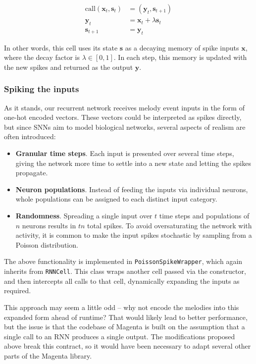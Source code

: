 \documentclass[../../report.tex]{subfiles}
\begin{document}
\begin{align*}
  \mathrm{call}(\bm{x}_t, \bm{s}_t) &= (\bm{y}_t, \bm{s}_{t+1}) \\
  \bm{y}_t &= \bm{x}_t + \lambda\bm{s}_{t} \\
  \bm{s}_{t+1} &= \bm{y}_t
\end{align*}

In other words, this cell uses its state \(\bm{s}\) as a decaying memory of
spike inputs \(\bm{x}\), where the decay factor is \(\lambda \in [0, 1]\). In
each step, this memory is updated with the new spikes and returned as the output
\(\bm{y}\).

\subsubsection{Spiking the inputs}
As it stands, our recurrent network receives melody event inputs in the form of
one-hot encoded vectors. These vectors could be interpreted as spikes directly,
but since SNNs aim to model biological networks, several aspects of realism are
often introduced:

\begin{itemize}
  \item \textbf{Granular time steps}. Each input is presented over several time
  steps, giving the network more time to settle into a new state and letting the
  spikes propagate.

  \item \textbf{Neuron populations}. Instead of feeding the inputs via
  individual neurons, whole populations can be assigned to each distinct input
  category.

  \item \textbf{Randomness}. Spreading a single input over \(t\) time steps and
  populations of \(n\) neurons results in \(tn\) total spikes. To avoid
  oversaturating the network with activity, it is common to make the input
  spikes stochastic by sampling from a Poisson distribution.
\end{itemize}

The above functionality is implemented in \texttt{PoissonSpikeWrapper}, which
again inherits from \texttt{RNNCell}. This class wraps another cell passed via
the constructor, and then intercepts all calls to that cell, dynamically
expanding the inputs as required.

This approach may seem a little odd -- why not encode the melodies into this
expanded form ahead of runtime? That would likely lead to better performance,
but the issue is that the codebase of Magenta is built on the assumption that a
single call to an RNN produces a single output. The modifications proposed above
break this contract, so it would have been necessary to adapt several other
parts of the Magenta library.
\end{document}
